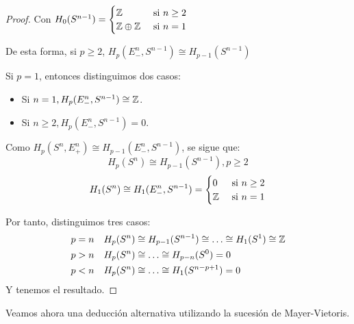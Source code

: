\begin{proof}
  Con $H_0(S^{n-1}) = \begin{cases} \mathbb{Z} &\text{ si } n \geq 2 \\ \mathbb{Z} \oplus \mathbb{Z} &\text{ si } n = 1 \end{cases}$

  De esta forma, si $p \geq 2$, $H_p(E_-^n, S^{n-1}) \cong H_{p-1}(S^{n-1})$

  Si $p = 1$, entonces distinguimos dos casos:

  \begin{itemize}
    \item Si $n = 1, H_p(E_-^n, S^{n-1}) \cong \mathbb{Z}$.
    \item Si $n \geq 2, H_p(E_-^n, S^{n-1}) = 0$.
  \end{itemize}

  Como $H_p(S^n, E_+^n) \cong H_{p-1}(E_-^n, S^{n-1})$, se sigue que:
  \[ H_p(S^n) \cong H_{p-1}(S^{n-1}), p \geq 2 \]
  \[ H_1(S^n) \cong H_1(E_-^n, S^{n-1}) = \begin{cases} 0 &\text{ si } n \geq 2 \\ \mathbb{Z} &\text{ si } n = 1 \end{cases} \]

  Por tanto, distinguimos tres casos:
  \begin{align*}
      p = n &\quad H_p(S^n) \cong H_{p-1}(S^{n-1}) \cong \dots \cong H_1(S^1) \cong \mathbb{Z} \\
      p > n &\quad H_p(S^n) \cong \dots \cong H_{p-n}(S^0) = 0 \\
      p < n &\quad H_p(S^n) \cong \dots \cong H_1(S^{n-p+1}) = 0
  \end{align*}
  Y tenemos el resultado.
\end{proof}

Veamos ahora una deducción alternativa utilizando la sucesión de Mayer-Vietoris.

